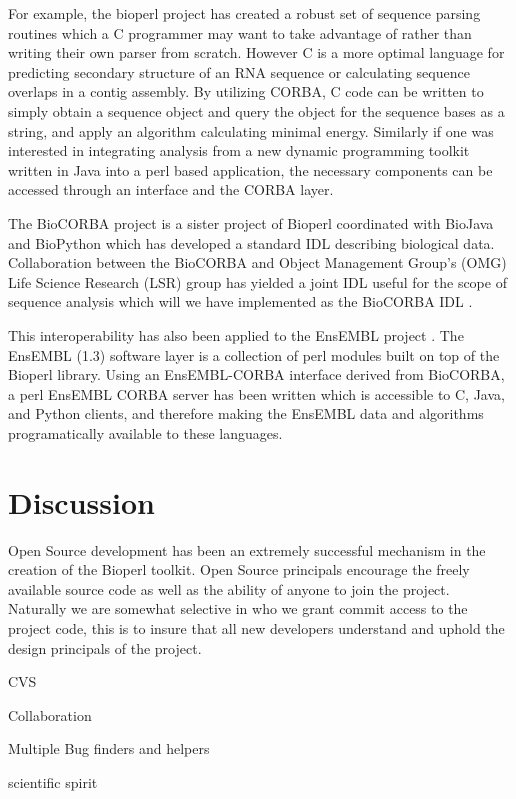 \documentclass[twocolumn]{article}
\begin{document}
For example, the bioperl project has created a robust set of sequence
parsing routines which a C programmer may want to take advantage of
rather than writing their own parser from scratch.  However C is a
more optimal language for predicting secondary structure of an RNA
sequence or calculating sequence overlaps in a contig assembly.  By
utilizing CORBA, C code can be written to simply obtain a sequence
object and query the object for the sequence bases as a string, and
apply an algorithm calculating minimal energy.  Similarly if one was
interested in integrating analysis from a new dynamic programming
toolkit written in Java into a perl based application, the necessary
components can be accessed through an interface and the CORBA layer.

The BioCORBA project is a sister project of Bioperl coordinated with
BioJava \cite{biojava} and BioPython \cite{biopython} which has
developed a standard IDL describing biological data.  Collaboration
between the BioCORBA and Object Management Group's (OMG) Life Science
Research (LSR) group has yielded a joint IDL useful for the scope of
sequence analysis which will we have implemented as the BioCORBA IDL
\cite{biocorba}.

This interoperability has also been applied to the EnsEMBL project
\cite{ensembl-nar}.  The EnsEMBL (1.3) software layer is a
collection of perl modules built on top of the Bioperl library.
Using an EnsEMBL-CORBA interface derived from BioCORBA, a perl EnsEMBL
CORBA server has been written which is accessible to C, Java, and
Python clients, and therefore making the EnsEMBL data and algorithms
programatically available to these languages.

\section{Discussion}

Open Source development has been an extremely successful mechanism in
the creation of the Bioperl toolkit.  Open Source principals encourage
the freely available source code as well as the ability of anyone to
join the project.  Naturally we are somewhat selective in who we grant
commit access to the project code, this is to insure that all new
developers understand and uphold the design principals of the project.

CVS

Collaboration

Multiple Bug finders and helpers

scientific spirit
\end{document}

